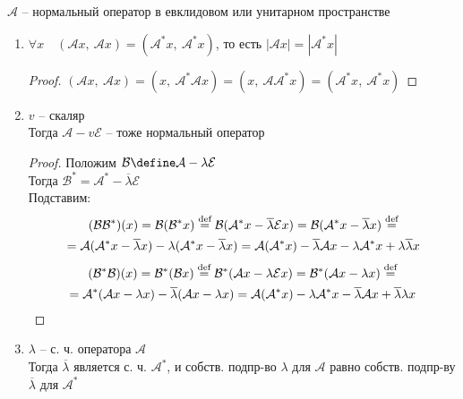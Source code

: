 \begin{properties}
	$ \mathcal{A} $ -- нормальный оператор в евклидовом или унитарном пространстве
	\begin{enumerate}
		\item\label{en:471} $ \forall x \quad (\mathcal{A}x, ~ \mathcal{A}x) = (\mathcal{A}^*x, ~ \mathcal{A}^*x) $, то есть $ |\mathcal{A}x| = |\mathcal{A}^*x | $
		\begin{proof}
			$ (\mathcal{A}x, ~ \mathcal{A}x) = (x, ~ \mathcal{A}^*\mathcal{A}x) = (x, ~ \mathcal{A}\mathcal{A}^*x) = (\mathcal{A}^*x, ~ \mathcal{A}^*x) $
		\end{proof}
		\item\label{en:472} $ v $ -- скаляр \\
		Тогда $ \mathcal{A} - v\mathcal{E} $ -- тоже нормальный оператор
		\begin{proof}
			Положим $ \mathcal{B} \define \mathcal{A} - \lambda \mathcal{E} $ \\
			Тогда $ \mathcal{B}^* = \mathcal{A}^* - \overline\lambda \mathcal{E} $ \\
			Подставим:
			\begin{multline*}
				(\mathcal{B}\mathcal{B}^*)(x) = \mathcal{B}(\mathcal{B}^*x) \stackrel{\text{def}}{=} \mathcal{B}(\mathcal{A}^*x - \overline\lambda\mathcal{E}x) = \mathcal{B}(\mathcal{A}^*x - \overline\lambda x) \stackrel{\text{def}}{=} \\
				= \mathcal{A}(\mathcal{A}^*x - \overline\lambda x) - \lambda(\mathcal{A}^*x - \overline\lambda x) = \mathcal{A}(\mathcal{A}^*x) - \overline\lambda\mathcal{A}x - \lambda\mathcal{A}^*x + \lambda\overline\lambda x
			\end{multline*}
			\begin{multline*}
				(\mathcal{B}^*\mathcal{B})(x) = \mathcal{B}^*(\mathcal{B}x) \stackrel{\text{def}}{=} \mathcal{B}^*(\mathcal{A}x - \lambda \mathcal{E}x) = \mathcal{B}^*(\mathcal{A}x - \lambda x) \stackrel{\text{def}}{=} \\
				= \mathcal{A}^*(\mathcal{A}x - \lambda x) - \overline\lambda(\mathcal{A}x - \lambda x) = \mathcal{A}(\mathcal{A}^*x) - \lambda\mathcal{A}^*x - \overline\lambda\mathcal{A}x + \overline\lambda\lambda x
			\end{multline*}
		\end{proof}
		\item $ \lambda $ -- с. ч. оператора $ \mathcal{A} $ \\
		Тогда $ \overline\lambda $ является с. ч. $ \mathcal{A}^* $, и собств. подпр-во $ \lambda $ для $ \mathcal{A} $ равно собств. подпр-ву $ \overline\lambda $ для $ \mathcal{A}^* $

\end{enumerate}
\end{properties}
